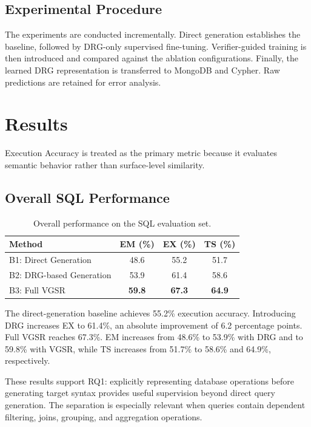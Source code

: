 \documentclass[conference]{IEEEtran}
\begin{document}
\subsection{Experimental Procedure}
The experiments are conducted incrementally. Direct generation establishes the baseline, followed by DRG-only supervised fine-tuning. Verifier-guided training is then introduced and compared against the ablation configurations. Finally, the learned DRG representation is transferred to MongoDB and Cypher. Raw predictions are retained for error analysis.

\section{Results}
\label{sec:results}
Execution Accuracy is treated as the primary metric because it evaluates semantic behavior rather than surface-level similarity.

\subsection{Overall SQL Performance}
\begin{table}[t]
\centering
\caption{Overall performance on the SQL evaluation set.}
\label{tab:overall_results}
\begin{tabular}{lccc}
\toprule
Method & EM (\%) & EX (\%) & TS (\%)\\
\midrule
B1: Direct Generation & 48.6 & 55.2 & 51.7\\
B2: DRG-based Generation & 53.9 & 61.4 & 58.6\\
B3: Full VGSR & \textbf{59.8} & \textbf{67.3} & \textbf{64.9}\\
\bottomrule
\end{tabular}
\end{table}

The direct-generation baseline achieves 55.2\% execution accuracy. Introducing DRG increases EX to 61.4\%, an absolute improvement of 6.2 percentage points. Full VGSR reaches 67.3\%. EM increases from 48.6\% to 53.9\% with DRG and to 59.8\% with VGSR, while TS increases from 51.7\% to 58.6\% and 64.9\%, respectively.

These results support RQ1: explicitly representing database operations before generating target syntax provides useful supervision beyond direct query generation. The separation is especially relevant when queries contain dependent filtering, joins, grouping, and aggregation operations.
\end{document}
